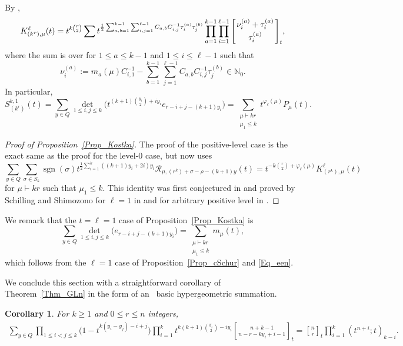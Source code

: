 \documentclass[pdftex]{sigma}
\numberwithin{equation}{section}
\newtheorem{Corollary}[Theorem]{Corollary}
\renewcommand{\leq}{\leqslant}
\renewcommand{\geq}{\geqslant}
\DeclareMathOperator{\sgn}{sgn}
\newcommand{\qbin}[2]{\genfrac{[}{]}{0pt}{}{#1}{#2}}
\newcommand{\qBin}[2]{\Bigg[\genfrac{}{}{0pt}{}{#1}{#2}\Bigg]}
\begin{document}
By \cite[equation~(6.7)]{SS01},
\[
K_{(k^r),\mu}^{\ell}(t)=t^{k\binom{r}{2}}
\sum t^{\frac{1}{2}\sum_{a,b=1}^{k-1}\sum_{i,j=1}^{\ell-1}
C_{a,b} C^{-1}_{i,j} \tau_i^{(a)}\tau_j^{(b)}}
\prod_{a=1}^{k-1}\prod_{i=1}^{\ell-1}
\qBin{\nu_i^{(a)}+\tau_i^{(a)}}{\tau_i^{(a)}}_t,
\]
where the sum is over  for
$1\leq a\leq k-1$ and $1\leq i\leq \ell-1$ such that
\[
\nu_i^{(a)}:=m_a(\mu) C^{-1}_{i,1}-
\sum_{b=1}^{k-1} \sum_{j=1}^{\ell-1}
C_{a,b} C^{-1}_{i,j} \tau_j^{(b)}\in\mathbb{N}_0.
\]
In particular,
\begin{equation*}%
S_{(k^r)}^{k,1}(t)=
\sum_{y\in Q} \det_{1\leq i,j\leq k}
\bigl(t^{(k+1)\binom{y_i}{2}+iy_i} e_{r-i+j-(k+1)y_i} \bigr)=
\sum_{\substack{\mu\vdash kr\\[1pt] \mu_1\leq k}} t^{\varphi_{\ell}(\mu)}
P_{\mu}(t).
\end{equation*}

\begin{proof}[Proof of Proposition~\ref{Prop_Kostka}]
The proof of the positive-level case is the exact same as the proof for the
level-$0$ case, but now uses
\[
\sum_{y\in Q}\sum_{\sigma\in S_k}
\sgn(\sigma) t^{\frac{1}{2}\sum_{i=1}^k ((k+1)y_i+2i)y_i}
\mathcal{R}_{\mu,(r^k)+\sigma-\rho-(k+1)y}(t)=
t^{-k\binom{r}{2}+\varphi_{\ell}(\mu)}
K_{(r^k),\mu}^{\ell}(t)
\]
for $\mu\vdash kr$ such that $\mu_1\leq k$.
This identity was first conjectured in \cite[equation~(9.2)]{SW99}
and proved by Schilling and Shimozono for $\ell=1$ in \cite{SS00}
and for arbitrary positive level in \cite[Section 6.2]{SS01}.
\end{proof}

We remark that the $t=\ell=1$ case of Proposition~\ref{Prop_Kostka} is
\[
\sum_{y\in Q} \det_{1\leq i,j\leq k}
\bigl(e_{r-i+j-(k+1)y_i} \bigr)=
\sum_{\substack{\mu\vdash kr\\[1pt] \mu_1\leq k}} m_{\mu}(t),
\]
which follows from the $\ell=1$ case of
Proposition~\ref{Prop_cSchur} and \eqref{Eq_een}.

We conclude this section with a straightforward corollary of
Theorem~\ref{Thm_GLn} in the form of an~
basic hypergeometric summation.

\begin{Corollary}
For $k\geq 1$ and $0\leq r\leq n$ integers,
\begin{gather*}
\sum_{y\in Q} \prod_{1\leq i<j\leq k}\! \bigl(1-t^{k(y_i-y_j)-i+j}\bigr)
\!\prod_{i=1}^k t^{k(k+1)\binom{y_i}{2}-iy_i}
\qbin{n+k-1}{n-r-ky_i+i-1}_t\!
 =\qbin{n}{r}_t \prod_{i=1}^k (t^{n+i};t)_{k-i}.
\end{gather*}
\end{Corollary}
\end{document}
